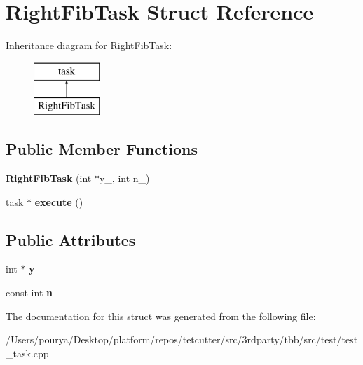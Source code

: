 \hypertarget{structRightFibTask}{}\section{Right\+Fib\+Task Struct Reference}
\label{structRightFibTask}
Inheritance diagram for Right\+Fib\+Task\+:\begin{figure}[H]
\begin{center}
\leavevmode
\includegraphics[height=2.000000cm]{structRightFibTask}
\end{center}
\end{figure}
\subsection*{Public Member Functions}
\begin{DoxyCompactItemize}
\item 
\hypertarget{structRightFibTask_ae1670f1c45231b2fd9710e9c6002966b}{}{\bfseries Right\+Fib\+Task} (int $\ast$y\+\_\+, int n\+\_\+)\label{structRightFibTask_ae1670f1c45231b2fd9710e9c6002966b}

\item 
\hypertarget{structRightFibTask_aa69806091021efc5dba9d3ca5d0d26a1}{}task $\ast$ {\bfseries execute} ()\label{structRightFibTask_aa69806091021efc5dba9d3ca5d0d26a1}

\end{DoxyCompactItemize}
\subsection*{Public Attributes}
\begin{DoxyCompactItemize}
\item 
\hypertarget{structRightFibTask_a3ea70e7e3cd38c7060ae5a0ec5969175}{}int $\ast$ {\bfseries y}\label{structRightFibTask_a3ea70e7e3cd38c7060ae5a0ec5969175}

\item 
\hypertarget{structRightFibTask_a3bd39a801605bac16a11a63863d53c1f}{}const int {\bfseries n}\label{structRightFibTask_a3bd39a801605bac16a11a63863d53c1f}

\end{DoxyCompactItemize}


The documentation for this struct was generated from the following file\+:\begin{DoxyCompactItemize}
\item 
/\+Users/pourya/\+Desktop/platform/repos/tetcutter/src/3rdparty/tbb/src/test/test\+\_\+task.\+cpp\end{DoxyCompactItemize}
